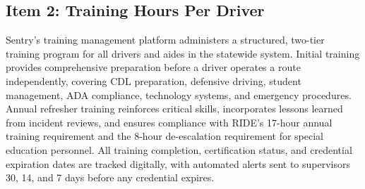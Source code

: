 
\subsection{Item 2: Training Hours Per Driver}

Sentry's training management platform administers a structured, two-tier training program for all drivers and aides in the statewide system. Initial training provides comprehensive preparation before a driver operates a route independently, covering CDL preparation, defensive driving, student management, ADA compliance, technology systems, and emergency procedures. Annual refresher training reinforces critical skills, incorporates lessons learned from incident reviews, and ensures compliance with RIDE's 17-hour annual training requirement and the 8-hour de-escalation requirement for special education personnel. All training completion, certification status, and credential expiration dates are tracked digitally, with automated alerts sent to supervisors 30, 14, and 7 days before any credential expires.

\vspace{0.3cm}

